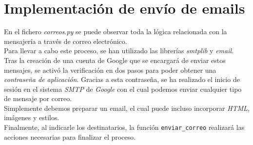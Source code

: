 \documentclass[12pt]{report}
\begin{document}
\section{Implementación de envío de emails}
En el fichero \textit{correos.py} se puede observar toda la lógica relacionada con la mensajería a través de correo electrónico.\\
Para llevar a cabo este proceso, se han utilizado las librerías \textit{smtplib} y \textit{email}.\\
Tras la creación de una cuenta de Google que se encargará de enviar estos mensajes, se activó la verificación en dos pasos para poder obtener una \textit{contraseña de aplicación}. Gracias a esta contraseña, se ha realizado el inicio de sesión en el sistema \textit{SMTP} de \textit{Google} con el cual podemos enviar cualquier tipo de mensaje por correo.\\
Simplemente debemos preparar un email, el cual puede incluso incorporar \textit{HTML}, imágenes y estilos.\\
Finalmente, al indicarle los destinatarios, la función \texttt{enviar\_correo} realizará las acciones necesarias para finalizar el proceso.
\end{document}
